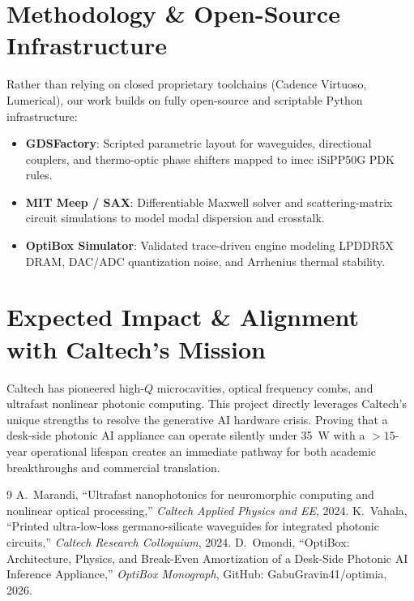 \documentclass[11pt,a4paper]{article}
\begin{document}
\section{Methodology \& Open-Source Infrastructure}
Rather than relying on closed proprietary toolchains (Cadence Virtuoso, Lumerical), our work builds on fully open-source and scriptable Python infrastructure:
\begin{itemize}
    \item \textbf{GDSFactory}: Scripted parametric layout for waveguides, directional couplers, and thermo-optic phase shifters mapped to imec iSiPP50G PDK rules.
    \item \textbf{MIT Meep / SAX}: Differentiable Maxwell solver and scattering-matrix circuit simulations to model modal dispersion and crosstalk.
    \item \textbf{OptiBox Simulator}: Validated trace-driven engine modeling LPDDR5X DRAM, DAC/ADC quantization noise, and Arrhenius thermal stability.
\end{itemize}

\section{Expected Impact \& Alignment with Caltech's Mission}
Caltech has pioneered high-$Q$ microcavities, optical frequency combs, and ultrafast nonlinear photonic computing. This project directly leverages Caltech's unique strengths to resolve the generative AI hardware crisis. Proving that a desk-side photonic AI appliance can operate silently under 35~W with a $>15$-year operational lifespan creates an immediate pathway for both academic breakthroughs and commercial translation.

\begin{thebibliography}{9}
A.~Marandi, ``Ultrafast nanophotonics for neuromorphic computing and nonlinear optical processing,'' \textit{Caltech Applied Physics and EE}, 2024.
K.~Vahala, ``Printed ultra-low-loss germano-silicate waveguides for integrated photonic circuits,'' \textit{Caltech Research Colloquium}, 2024.
D.~Omondi, ``OptiBox: Architecture, Physics, and Break-Even Amortization of a Desk-Side Photonic AI Inference Appliance,'' \textit{OptiBox Monograph}, GitHub: GabuGravin41/optimia, 2026.
\end{thebibliography}
\end{document}

